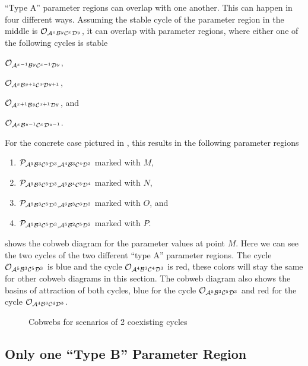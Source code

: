``Type A'' parameter regions can overlap with one another.
This can happen in four different ways.
Assuming the stable cycle of the parameter region in the middle is $\mathcal{O}_{\mathcal{A}^x\mathcal{B}^y\mathcal{C}^x\mathcal{D}^y}$, it can overlap with parameter regions, where either one of the following cycles is stable
\begin{enumerate*}
    \item $\mathcal{O}_{\mathcal{A}^{x-1}\mathcal{B}^y\mathcal{C}^{x-1}\mathcal{D}^y}$,
    \item $\mathcal{O}_{\mathcal{A}^x\mathcal{B}^{y+1}\mathcal{C}^x\mathcal{D}^{y+1}}$,
    \item $\mathcal{O}_{\mathcal{A}^{x+1}\mathcal{B}^y\mathcal{C}^{x+1}\mathcal{D}^y}$, and
    \item $\mathcal{O}_{\mathcal{A}^x\mathcal{B}^{y-1}\mathcal{C}^x\mathcal{D}^{y-1}}$.
\end{enumerate*}
For the concrete case pictured in , this results in the following parameter regions
\begin{enumerate}
    \item $\mathcal{P}_{\mathcal{A}^5\mathcal{B}^3\mathcal{C}^5\mathcal{D}^3, \mathcal{A}^4\mathcal{B}^3\mathcal{C}^4\mathcal{D}^3}$ marked with $M$,
    \item $\mathcal{P}_{\mathcal{A}^5\mathcal{B}^3\mathcal{C}^5\mathcal{D}^3, \mathcal{A}^5\mathcal{B}^4\mathcal{C}^5\mathcal{D}^4}$ marked with $N$,
    \item $\mathcal{P}_{\mathcal{A}^5\mathcal{B}^3\mathcal{C}^5\mathcal{D}^3, \mathcal{A}^6\mathcal{B}^3\mathcal{C}^6\mathcal{D}^3}$ marked with $O$, and
    \item $\mathcal{P}_{\mathcal{A}^5\mathcal{B}^3\mathcal{C}^5\mathcal{D}^3, \mathcal{A}^5\mathcal{B}^2\mathcal{C}^5\mathcal{D}^2}$ marked with $P$.
\end{enumerate}
 shows the cobweb diagram for the parameter values at point $M$.
Here we can see the two cycles of the two different ``type A'' parameter regions.
The cycle $\mathcal{O}_{\mathcal{A}^5\mathcal{B}^3\mathcal{C}^5\mathcal{D}^3}$ is blue and the cycle $\mathcal{O}_{\mathcal{A}^4\mathcal{B}^3\mathcal{C}^4\mathcal{D}^3}$ is red, these colors will stay the same for other cobweb diagrams in this section.
The cobweb diagram also shows the basins of attraction of both cycles, blue for the cycle $\mathcal{O}_{\mathcal{A}^5\mathcal{B}^3\mathcal{C}^5\mathcal{D}^3}$ and red for the cycle $\mathcal{O}_{\mathcal{A}^4\mathcal{B}^3\mathcal{C}^4\mathcal{D}^3}$.

\begin{figure}
    \centering
    \caption{Cobwebs for scenarios of 2 coexisting cycles}
\end{figure}

\subsection{Only one ``Type B'' Parameter Region}

